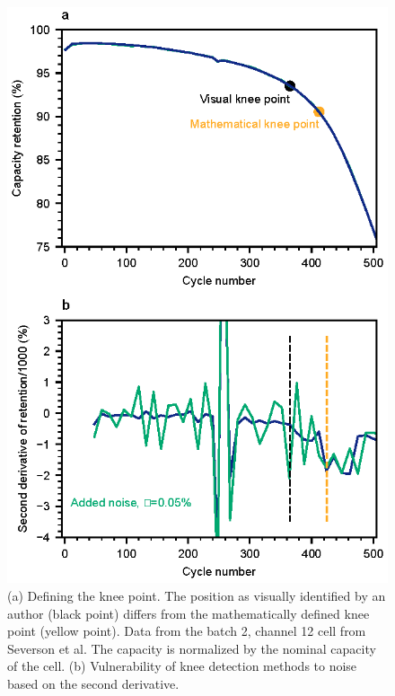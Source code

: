 \documentclass[journal=jpclcd,manuscript=article]{achemso}
\begin{document}
\begin{figure}[!ht]
\centering
\includegraphics[scale=1]{figures/knee_definition.eps}
\caption{(a) Defining the knee point. The position as visually identified by an author (black point) differs from the mathematically defined knee point (yellow point). Data from the batch 2, channel 12 cell from Severson et al.\cite{severson_data-driven_2019} The capacity is normalized by the nominal capacity of the cell. (b) Vulnerability of knee detection methods to noise based on the second derivative.}
\label{fig:knee_definition3}
\end{figure}
\end{document}

